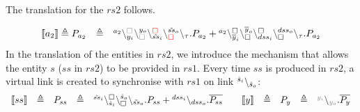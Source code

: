 \begin{example}
%


\noindent
The translation for the $rs2$ follows.

\[
\begin{array}{lcl}
\llbracket a_2\rrbracket \defeq P_{a_2}&\defeq &\startchain{a_2}\chainedlink{y_i}{{\color{gray}\noact}}\chainedlink{{\color{gray}\noact}}{y_o}\chainedlink{\tilde{ss}_i}{{\color{red}\noact}}\chainedlink{{\color{red}\noact}}{\tilde{ss}_o}\chainend{\silent}.P_{a_2}+
\startchain{a_2}\chainedlink{\overline{y}_i}{\noact}\chainedlink{\noact}{\overline{y}_o}    
\chainedlink{dss_i}{\noact}\chainedlink{\noact}{dss_o}\chainend{\silent}.P_{a_2}\\
%
\end{array}
\]
\noindent
In the translation of the entities in  $rs2$, we introduce the mechanism that allows the entity
$s$ ($ss$ in $rs2$) to be provided in $rs1$. Every time $ss$ is produced in $rs2$,  a virtual link is
created to synchronise with $rs1$   on link ${}^{\hat{s}_i} \backslash_{\hat{s}_o}$:
\[
\begin{array}{lclcl@{\qquad} lclcl}
\llbracket ss \rrbracket& \defeq& P_{ss}&\defeq &\startchain{\tilde{ss}_i}\chainedlink{\hat{s}_i}{\noact}\chainedlink{\noact}{\hat{s}_o}\chainend{\tilde{ss}_o}.P_{ss}+
\startchain{dss_i}   \chainend{dss_o}.\overline{P_{ss}}
&
\llbracket y\rrbracket&\defeq & P_{y}&\defeq &\startchain{{\color{gray}y_i}}\chainend{{\color{gray}y_o}}.\overline{P_{y}} \\

\end{array}\]
\end{example}
